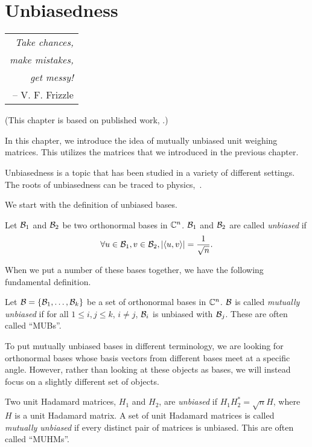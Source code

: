 \chapter[Unbiasedness]{Unbiasedness}
\label{ch:unbiased}

\hfill\begin{tabular}{r}\toprule
 {\it Take chances,} \\ {\it make mistakes,} \\ {\it get messy!} \\
 -- V. F. Frizzle\\
\bottomrule\end{tabular}\vskip25pt

(This chapter is based on published work, \cite{muwm13}.)

In this chapter, we introduce the idea of mutually unbiased unit weighing matrices. This utilizes the matrices that we introduced in the previous chapter.

Unbiasedness is a topic that has been studied in a variety of different settings. The roots of unbiasedness can be traced to physics,~\cite{ivanovic,mub-orig,space-time-block}.

We start with the definition of unbiased bases.

\begin{definition} \label{def:unbiased-bases}
 Let $\mathcal{B}_1$ and $\mathcal{B}_2$ be two orthonormal bases in $\mathbb{C}^n$. $\mathcal{B}_1$ and $\mathcal{B}_2$ are called {\it unbiased} if $$\forall u \in \mathcal{B}_1,v \in \mathcal{B}_2, | \langle u , v \rangle | = \frac{1}{\sqrt{n}}.$$
\end{definition}

When we put a number of these bases together, we have the following fundamental definition.

\begin{definition} \label{def:mub}
 Let $\mathcal{B} = \left\{\mathcal{B}_1,\dots,\mathcal{B}_k\right\}$ be a set of orthonormal bases in $\mathbb{C}^n$. $\mathcal{B}$ is called {\it mutually unbiased} if for all $1 \leq i,j \leq k$, $i \neq j$, $\mathcal{B}_i$ is unbiased with $\mathcal{B}_j$. These are often called ``MUBs''.
\end{definition}

To put mutually unbiased bases in different terminology, we are looking for orthonormal bases whose basis vectors from different bases meet at a specific angle. However, rather than looking at these objects as bases, we will instead focus on a slightly different set of objects.

\begin{definition} \label{def:muhm}
 Two unit Hadamard matrices, $H_1$ and $H_2$, are {\it unbiased} if $H_1H_2^* = \sqrt{n}H$, where $H$ is a unit Hadamard matrix. A set of unit Hadamard matrices is called {\it mutually unbiased} if every distinct pair of matrices is unbiased. This are often called ``MUHMs''.
\end{definition}

